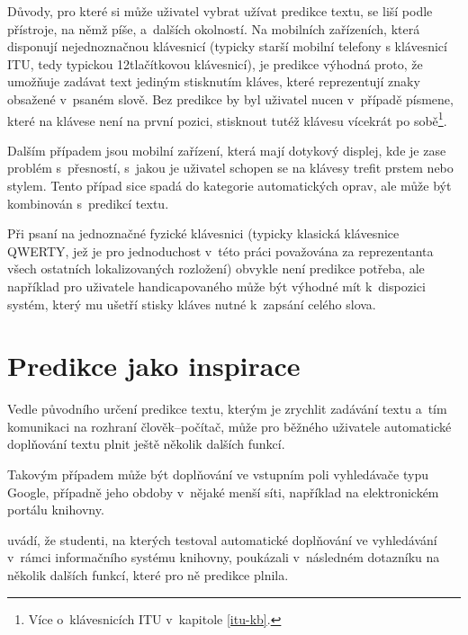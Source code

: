 \documentclass[a4paper,11pt,openany]{book} %
\begin{document}
Důvody, pro které si může uživatel vybrat užívat predikce textu, se liší podle přístroje, na němž píše, a~dalších okolností. Na mobilních zařízeních, která disponují nejednoznačnou klávesnicí (typicky starší mobilní telefony s klávesnicí ITU, tedy typickou 12tlačítkovou klávesnicí), je predikce výhodná proto, že umožňuje zadávat text jediným stisknutím kláves, které reprezentují znaky obsažené v~psaném slově. Bez predikce by byl uživatel nucen v~případě písmene, které na klávese není na první pozici, stisknout tutéž klávesu vícekrát po sobě\footnote{Více o~klávesnicích ITU v~kapitole \ref{itu-kb}.}.

Dalším případem jsou mobilní zařízení, která mají dotykový displej, kde je zase problém s~přesností, s~jakou je uživatel schopen se na klávesy trefit prstem nebo stylem. Tento případ sice spadá do kategorie automatických oprav, ale může být kombinován s~predikcí textu. \parencite{kocienda2012method} %

Při psaní na jednoznačné fyzické klávesnici (typicky klasická klávesnice QWERTY, jež je pro jednoduchost v~této práci považována za reprezentanta všech ostatních lokalizovaných rozložení) obvykle není predikce potřeba, ale například pro uživatele handicapovaného může být výhodné mít k~dispozici systém, který mu ušetří stisky kláves nutné k~zapsání celého slova.

\section{Predikce jako inspirace}

Vedle původního určení predikce textu, kterým je zrychlit zadávání textu a~tím komunikaci na rozhraní člověk--počítač, může pro běžného uživatele automatické doplňování textu plnit ještě několik dalších funkcí.

Takovým případem může být doplňování ve vstupním poli vyhledávače typu Google, případně jeho obdoby v~nějaké menší síti, například na elektronickém portálu knihovny. \parencite{google2015}

\textcite{ward2012autocomplete} uvádí, že studenti, na kterých testoval automatické doplňování ve vyhledávání v~rámci informačního systému knihovny, poukázali v~následném dotazníku na několik dalších funkcí, které pro ně predikce plnila.
\end{document}
